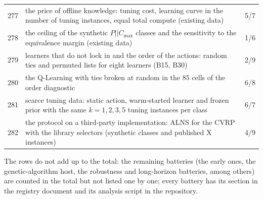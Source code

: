 \begin{table}[t]
{\begin{tabular}{@{}lp{}r@{}}
277 & the price of offline knowledge: tuning cost, learning curve in the number of tuning instances, equal total compute (existing data) & 5/7 \\
278 & the ceiling of the synthetic $P||C_{\max}$ classes and the sensitivity to the equivalence margin (existing data) & 1/6 \\
279 & learners that do not lock in and the order of the actions: random ties and permuted lists for eight learners (B15, B30) & 2/9 \\
280 & the Q-Learning with ties broken at random in the $85$ cells of the order diagnostic & 6/8 \\
281 & scarce tuning data: static action, warm-started learner and frozen prior with the same $k=1,2,3,5$ tuning instances per class & 6/7 \\
282 & the protocol on a third-party implementation: ALNS for the CVRP with the library selectors (synthetic classes and published X instances) & 4/9 \\
\bottomrule
\end{tabular}}
\end{table}

\noindent The rows do not add up to the total: the remaining batteries (the early ones, the genetic-algorithm host, the robustness and long-horizon batteries, among others) are counted in the total but not listed one by one; every battery has its section in the registry document and its analysis script in the repository.
